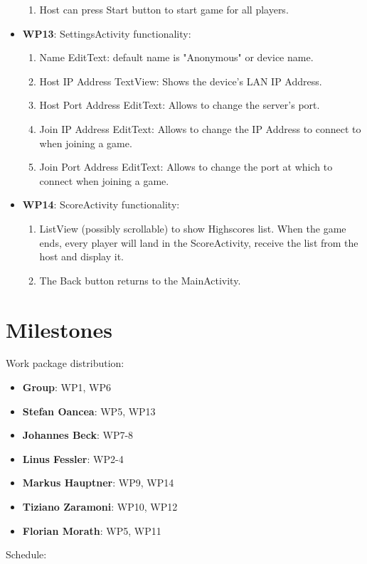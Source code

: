 \documentclass{report}
\begin{document}
\begin{itemize}
\begin{enumerate}
			\item Host can press Start button to start game for all players.
		\end{enumerate}
	\item {\bf WP13}: SettingsActivity functionality:
		\begin{enumerate}
			\item Name EditText: default name is "Anonymous" or device name.
			\item Host IP Address TextView: Shows the device's LAN IP Address.
			\item Host Port Address EditText: Allows to change the server's port.
			\item Join IP Address EditText: Allows to change the IP Address to connect to when joining a game.
			\item Join Port Address EditText: Allows to change the port at which to connect when joining a game.
		\end{enumerate}
	\item {\bf WP14}: ScoreActivity functionality:
		\begin{enumerate}
			\item ListView (possibly scrollable) to show Highscores list. When the game ends, every player will land in the ScoreActivity, receive the list from the host and display it.
			\item The Back button returns to the MainActivity.
		\end{enumerate}
\end{itemize}

\section{Milestones}


Work package distribution: 
\begin{itemize}	
	\item{\bf Group}: WP1, WP6
	\item {\bf Stefan Oancea}: WP5, WP13
	\item {\bf Johannes Beck}: WP7-8
	\item {\bf Linus Fessler}: WP2-4
	\item {\bf Markus Hauptner}: WP9, WP14
	\item {\bf Tiziano Zaramoni}: WP10, WP12
	\item {\bf Florian Morath}: WP5, WP11
\end{itemize}
Schedule:
\end{document}
